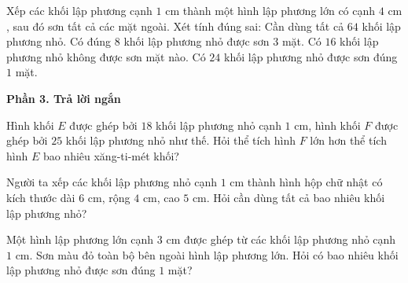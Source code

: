\begin{ex} %
Xếp các khối lập phương cạnh $1\text{ cm}$ thành một hình lập phương lớn có cạnh $4\text{ cm}$, sau đó sơn tất cả các mặt ngoài. Xét tính đúng sai:
\choiceTF
{\True Cần dùng tất cả $64$ khối lập phương nhỏ.}
{\True Có đúng $8$ khối lập phương nhỏ được sơn $3$ mặt.}
{Có $16$ khối lập phương nhỏ không được sơn mặt nào.}
{\True Có $24$ khối lập phương nhỏ được sơn đúng $1$ mặt.}
\end{ex}

\textbf{Phần 3. Trả lời ngắn}

\begin{ex} %
Hình khối $E$ được ghép bởi $18$ khối lập phương nhỏ cạnh $1\text{ cm}$, hình khối $F$ được ghép bởi $25$ khối lập phương nhỏ như thế. Hỏi thể tích hình $F$ lớn hơn thể tích hình $E$ bao nhiêu xăng-ti-mét khối?
\end{ex}

\begin{ex} %
Người ta xếp các khối lập phương nhỏ cạnh $1\text{ cm}$ thành hình hộp chữ nhật có kích thước dài $6\text{ cm}$, rộng $4\text{ cm}$, cao $5\text{ cm}$. Hỏi cần dùng tất cả bao nhiêu khối lập phương nhỏ?
\end{ex}

\begin{ex} %
Một hình lập phương lớn cạnh $3\text{ cm}$ được ghép từ các khối lập phương nhỏ cạnh $1\text{ cm}$. Sơn màu đỏ toàn bộ bên ngoài hình lập phương lớn. Hỏi có bao nhiêu khối lập phương nhỏ được sơn đúng $1$ mặt?
\end{ex}

